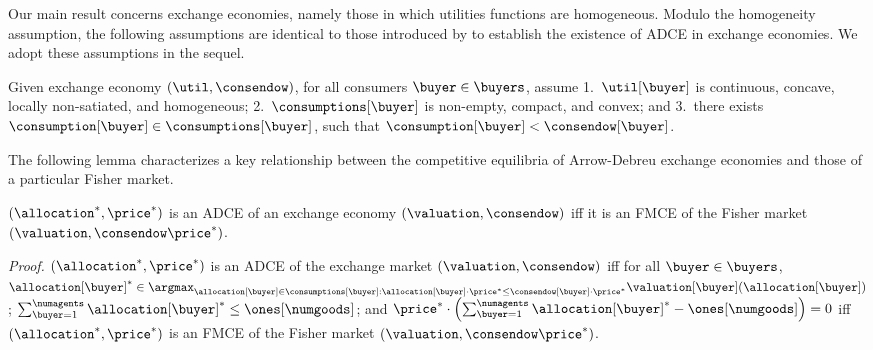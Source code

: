 Our main result concerns  exchange economies, namely those in which utilities functions are homogeneous.
Modulo the homogeneity assumption, the following assumptions are identical to those introduced by \citeauthor{arrow-debreu} \cite{arrow-debreu} to establish the existence of ADCE in exchange economies.
We adopt these assumptions in the sequel.

\begin{assumption}
\label{assum:ad_exist}
Given exchange economy $(\util, \consendow)$, for all consumers $\buyer \in \buyers$, assume 1.~$\util[\buyer]$ is continuous, concave,%
locally non-satiated, and homogeneous; 2.~$\consumptions[\buyer]$ is non-empty, compact, and convex; and 3.~there exists $\consumption[\buyer] \in \consumptions[\buyer]$, such that $\consumption[\buyer] < \consendow[\buyer]$.
\end{assumption}


The following lemma characterizes a key relationship between the competitive equilibria of Arrow-Debreu exchange economies and those of a particular Fisher market.

\begin{observation}
\label{obs:ad_fisher_eq_equiv}
    $(\allocation^*, \price^*)$ is an %
    ADCE of an exchange economy $(\valuation, \consendow)$ iff it is an FMCE
    of the Fisher market $(\valuation, \consendow \price^*)$.
\end{observation}

\vspace{-2.5mm}
\emph{Proof.}
$(\allocation^*, \price^*)$ is an ADCE
of the exchange market $(\valuation, \consendow)$ iff
        for all $\buyer \in \buyers$, $\allocation[\buyer]^* \in  \argmax_{\allocation[\buyer] \in \consumptions[\buyer]: \allocation[\buyer] \cdot \price^* \leq \consendow[\buyer] \cdot \price^*} \valuation[\buyer](\allocation[\buyer])$;
        $\sum_{\buyer = 1}^{\numagents} \allocation[\buyer]^* \leq \ones[\numgoods]$; and 
        $\price^* \cdot \left( \sum_{\buyer = 1}^{\numagents} \allocation[\buyer]^*  - \ones[\numgoods] \right) = 0$
    iff $(\allocation^*, \price^*)$ is an FMCE
    of the Fisher market $(\valuation, \consendow \price^*)$.

